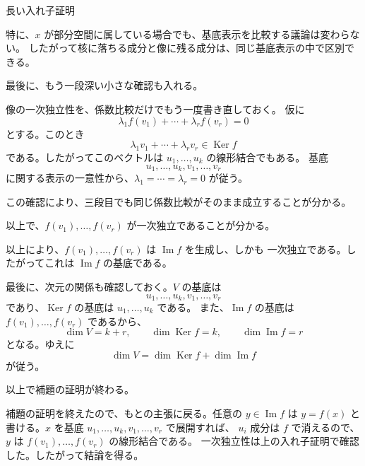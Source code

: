 \documentclass[a4paper,11pt]{ltjsarticle}
\begin{document}
\begin{Proof}{長い入れ子証明}
\begin{SubProof}[補題の証明]
\begin{SubProof}[一次独立性の確認]
特に、$x$ が部分空間に属している場合でも、基底表示を比較する議論は変わらない。
したがって核に落ちる成分と像に残る成分は、同じ基底表示の中で区別できる。

最後に、もう一段深い小さな確認も入れる。
\begin{SubProof}[タイトルつき三段目]
像の一次独立性を、係数比較だけでもう一度書き直しておく。
仮に
\[
  \lambda_1f(v_1)+\cdots+\lambda_rf(v_r)=0
\]
とする。このとき
\[
  \lambda_1v_1+\cdots+\lambda_rv_r\in\operatorname{Ker} f
\]
である。したがってこのベクトルは $u_1,\dots,u_k$ の線形結合でもある。
基底
\[
  u_1,\dots,u_k,v_1,\dots,v_r
\]
に関する表示の一意性から、$\lambda_1=\cdots=\lambda_r=0$ が従う。

この確認により、三段目でも同じ係数比較がそのまま成立することが分かる。
\end{SubProof}

以上で、$f(v_1),\dots,f(v_r)$ が一次独立であることが分かる。
\end{SubProof}

以上により、$f(v_1),\dots,f(v_r)$ は $\operatorname{Im} f$ を生成し、しかも
一次独立である。したがってこれは $\operatorname{Im} f$ の基底である。

最後に、次元の関係も確認しておく。$V$ の基底は
\[
  u_1,\dots,u_k,v_1,\dots,v_r
\]
であり、$\operatorname{Ker} f$ の基底は $u_1,\dots,u_k$ である。
また、$\operatorname{Im} f$ の基底は $f(v_1),\dots,f(v_r)$ であるから、
\[
  \dim V=k+r,\qquad
  \dim\operatorname{Ker} f=k,\qquad
  \dim\operatorname{Im} f=r
\]
となる。ゆえに
\[
  \dim V=\dim\operatorname{Ker} f+\dim\operatorname{Im} f
\]
が従う。

以上で補題の証明が終わる。
\end{SubProof}

補題の証明を終えたので、もとの主張に戻る。任意の $y\in\operatorname{Im} f$ は
$y=f(x)$ と書ける。$x$ を基底 $u_1,\dots,u_k,v_1,\dots,v_r$ で展開すれば、
$u_i$ 成分は $f$ で消えるので、$y$ は $f(v_1),\dots,f(v_r)$ の線形結合である。
一次独立性は上の入れ子証明で確認した。したがって結論を得る。
\end{Proof}
\end{document}
